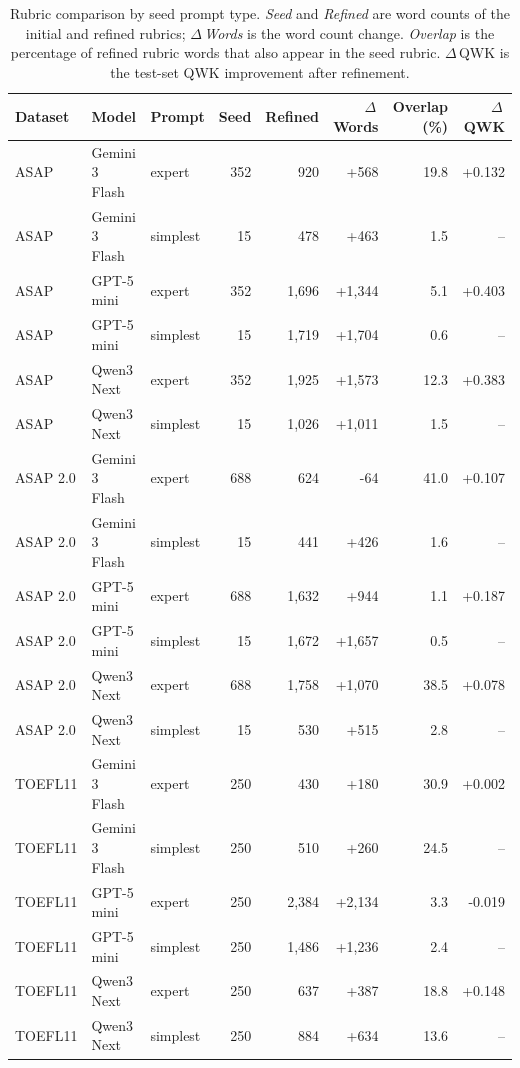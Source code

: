 \begin{table}[t]
\centering
\small
\caption{Rubric comparison by seed prompt type. \textit{Seed} and \textit{Refined} are word counts of the initial and refined rubrics; \textit{$\Delta$\,Words} is the word count change. \textit{Overlap} is the percentage of refined rubric words that also appear in the seed rubric. $\Delta$\,QWK is the test-set QWK improvement after refinement.}
\label{tab:rubric_comparison_by_seed}
\begin{tabular}{lll rrr r r}
\toprule
Dataset & Model & Prompt & Seed & Refined & $\Delta$\,Words & Overlap (\%) & $\Delta$\,QWK \\
\midrule
  ASAP & Gemini 3 Flash & expert & 352 & 920 & +568 & 19.8 & +0.132 \\
  ASAP & Gemini 3 Flash & simplest & 15 & 478 & +463 & 1.5 & -- \\
  ASAP & GPT-5 mini & expert & 352 & 1,696 & +1,344 & 5.1 & +0.403 \\
  ASAP & GPT-5 mini & simplest & 15 & 1,719 & +1,704 & 0.6 & -- \\
  ASAP & Qwen3 Next & expert & 352 & 1,925 & +1,573 & 12.3 & +0.383 \\
  ASAP & Qwen3 Next & simplest & 15 & 1,026 & +1,011 & 1.5 & -- \\
\midrule
  ASAP 2.0 & Gemini 3 Flash & expert & 688 & 624 & -64 & 41.0 & +0.107 \\
  ASAP 2.0 & Gemini 3 Flash & simplest & 15 & 441 & +426 & 1.6 & -- \\
  ASAP 2.0 & GPT-5 mini & expert & 688 & 1,632 & +944 & 1.1 & +0.187 \\
  ASAP 2.0 & GPT-5 mini & simplest & 15 & 1,672 & +1,657 & 0.5 & -- \\
  ASAP 2.0 & Qwen3 Next & expert & 688 & 1,758 & +1,070 & 38.5 & +0.078 \\
  ASAP 2.0 & Qwen3 Next & simplest & 15 & 530 & +515 & 2.8 & -- \\
\midrule
  TOEFL11 & Gemini 3 Flash & expert & 250 & 430 & +180 & 30.9 & +0.002 \\
  TOEFL11 & Gemini 3 Flash & simplest & 250 & 510 & +260 & 24.5 & -- \\
  TOEFL11 & GPT-5 mini & expert & 250 & 2,384 & +2,134 & 3.3 & -0.019 \\
  TOEFL11 & GPT-5 mini & simplest & 250 & 1,486 & +1,236 & 2.4 & -- \\
  TOEFL11 & Qwen3 Next & expert & 250 & 637 & +387 & 18.8 & +0.148 \\
  TOEFL11 & Qwen3 Next & simplest & 250 & 884 & +634 & 13.6 & -- \\
\bottomrule
\end{tabular}
\end{table}